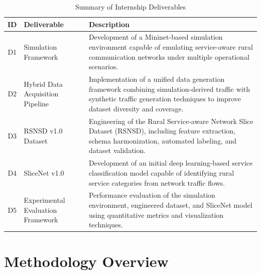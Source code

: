 \documentclass[12pt,a4paper]{report}
\begin{document}
	\begin{table}[H]
		\centering
		\caption{Summary of Internship Deliverables}
		\label{tab:deliverables}
		
		\begin{tabular}{|c|p{4cm}|p{8cm}|}
			\hline
			
			\textbf{ID} &
			\textbf{Deliverable} &
			\textbf{Description} \\
			\hline
			
			D1 &
			Simulation Framework &
			Development of a Mininet-based simulation environment capable of emulating service-aware rural communication networks under multiple operational scenarios. \\
			\hline
			
			D2 &
			Hybrid Data Acquisition Pipeline &
			Implementation of a unified data generation framework combining simulation-derived traffic with synthetic traffic generation techniques to improve dataset diversity and coverage. \\
			\hline
			
			D3 &
			RSNSD v1.0 Dataset &
			Engineering of the Rural Service-aware Network Slice Dataset (RSNSD), including feature extraction, schema harmonization, automated labeling, and dataset validation. \\
			\hline
			
			D4 &
			SliceNet v1.0 &
			Development of an initial deep learning-based service classification model capable of identifying rural service categories from network traffic flows. \\
			\hline
			
			D5 &
			Experimental Evaluation Framework &
			Performance evaluation of the simulation environment, engineered dataset, and SliceNet model using quantitative metrics and visualization techniques. \\
			\hline
			
		\end{tabular}
		
	\end{table}

	
	\section{Methodology Overview}
	\label{sec:methodology}
	
\end{document}
